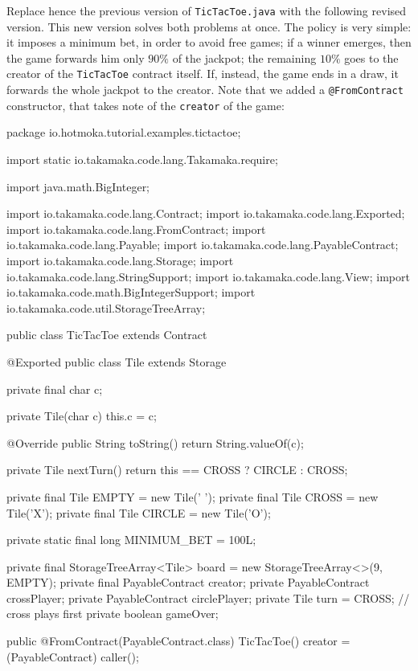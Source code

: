 Replace hence the previous version of \texttt{TicTacToe.java} with the following
revised version. This new version solves
both problems at once. The policy is very simple: it imposes a minimum
bet, in order to avoid free games; if a winner emerges,
then the game forwards him only $90\%$ of the jackpot; the remaining $10\%$ goes to the
creator of the \texttt{TicTacToe} contract itself. If, instead, the game ends in a draw,
it forwards the whole jackpot to the creator.
Note that we added a \texttt{@FromContract} constructor, that takes
note of the \texttt{creator} of the game:
%
\begin{codebox}\begin{javalst}
package io.hotmoka.tutorial.examples.tictactoe;

import static io.takamaka.code.lang.Takamaka.require;

import java.math.BigInteger;

import io.takamaka.code.lang.Contract;
import io.takamaka.code.lang.Exported;
import io.takamaka.code.lang.FromContract;
import io.takamaka.code.lang.Payable;
import io.takamaka.code.lang.PayableContract;
import io.takamaka.code.lang.Storage;
import io.takamaka.code.lang.StringSupport;
import io.takamaka.code.lang.View;
import io.takamaka.code.math.BigIntegerSupport;
import io.takamaka.code.util.StorageTreeArray;

public class TicTacToe extends Contract {

  @Exported
  public class Tile extends Storage {
    private final char c;

    private Tile(char c) {
      this.c = c;
    }

    @Override
    public String toString() {
      return String.valueOf(c);
    }

    private Tile nextTurn() {
      return this == CROSS ? CIRCLE : CROSS;
    }
  }

  private final Tile EMPTY = new Tile(' ');
  private final Tile CROSS = new Tile('X');
  private final Tile CIRCLE = new Tile('O');

  private static final long MINIMUM_BET = 100L;

  private final StorageTreeArray<Tile> board = new StorageTreeArray<>(9, EMPTY);
  private final PayableContract creator;
  private PayableContract crossPlayer;
  private PayableContract circlePlayer;
  private Tile turn = CROSS; // cross plays first
  private boolean gameOver;

  public @FromContract(PayableContract.class) TicTacToe() {
    creator = (PayableContract) caller();
  }

}
\end{javalst}
\end{codebox}
